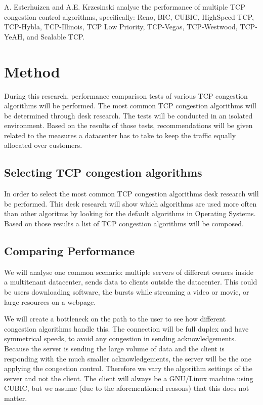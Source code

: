 \documentclass{article}
\begin{document}
A. Esterhuizen and A.E. Krzesinski\cite{multiple-congestion} analyse the
performance of multiple TCP congestion control algorithms, specifically: Reno,
BIC, CUBIC, HighSpeed TCP, TCP-Hybla, TCP-Illinois, TCP Low Priority,
TCP-Vegas, TCP-Westwood, TCP-YeAH, and Scalable TCP.


\section{Method}\label{sec:method}

During this research, performance comparison tests of various TCP congestion algorithms will be performed. The most common TCP congestion algorithms will be determined through desk research. The tests will be conducted in an isolated environment. Based on the results of those tests, recommendations will be given related to the measures a datacenter has to take to keep the traffic equally allocated over customers.


\subsection{Selecting TCP congestion algorithms}

In order to select the most common TCP congestion algorithms desk research will be performed. This desk research will show which algorithms are used more often than other algoritms by looking for the default algorithms in Operating Systems. Based on those results a list of TCP congestion algorithms will be composed.


\subsection{Comparing Performance}

We will analyse one common scenario: multiple servers of different owners
inside a multitenant datacenter, sends data to clients outside the datacenter.
This could be users downloading software, the bursts while streaming a video
or movie, or large resources on a webpage.

We will create a bottleneck on the path to the user to see how different
congestion algorithms handle this. The connection will be full duplex and have
symmetrical speeds, to avoid any congestion in sending acknowledgements.
Because the server is sending the large volume of data and the client is
responding with the much smaller acknowledgements, the server will be the one
applying the congestion control. Therefore we vary the algorithm settings of
the server and not the client. The client will always be a GNU/Linux machine
using CUBIC, but we assume (due to the aforementioned reasons) that this does
not matter.
\end{document}
